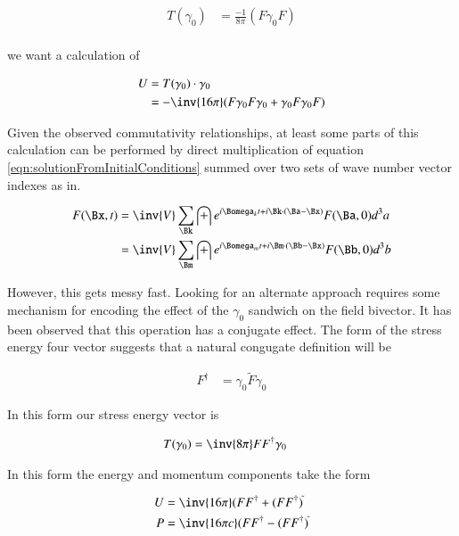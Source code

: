 \documentclass{article}
\begin{document}
\begin{align*}
T(\gamma_0) &= \frac{-1}{8\pi}(F \gamma_0 F) \\
\end{align*}

we want a calculation of

\begin{align*}
U 
&= T(\gamma_0) \cdot \gamma_0 \\
&= -\inv{16 \pi} ( F \gamma_0 F \gamma_0 + \gamma_0 F \gamma_0 F )
\end{align*}

Given the 
observed commutativity relationships, at 
least some parts of this calculation can be performed by direct multiplication of 
equation \ref{eqn:solutionFromInitialConditions} summed over two sets of wave
number vector indexes as in.

\begin{align*}
F(\Bx,t) 
&= \inv{V} \sum_{\Bk} \int e^{i \Bomega_k t + i \Bk \cdot (\Ba-\Bx) } F(\Ba, 0) d^3 a \\
&= \inv{V} \sum_{\Bm} \int e^{i \Bomega_m t + i \Bm \cdot (\Bb-\Bx) } F(\Bb, 0) d^3 b 
\end{align*}

However, this gets messy fast.  Looking for an alternate approach requires some mechanism for encoding the effect 
of the $\gamma_0$ sandwich on the field bivector.  It has been observed that this operation has a conjugate
effect.  The form of the stress energy four vector suggests that a natural congugate definition will be

\begin{align}
F^\dagger &= \gamma_0 \tilde{F} \gamma_0
\end{align}

In this form our stress energy vector is

\begin{align}
T(\gamma_0) &= \inv{8 \pi} F F^\dagger \gamma_0
\end{align}

In this form the energy and momentum components take the form

\begin{align}
U &= \inv{16 \pi} (F F^\dagger + (F F^\dagger)^{\tilde{}} \\
P &= \inv{16 \pi c} (F F^\dagger - (F F^\dagger)^{\tilde{}} \\
\end{align}
\end{document}
